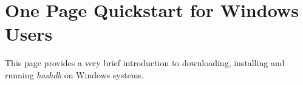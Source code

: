 \documentclass[11pt,fleqn]{article} %
\begin{document}
\newcommand \hdb {\textit{hashdb}\xspace}
\newcommand \sscope {\textit{SectorScope}\xspace}
\newcommand \bulk {\textbf{bulk\_extractor}\xspace}
\newcommand \mdd {\textbf{md5deep}\xspace}
\newcommand \fiwalk {\textbf{fiwalk}\xspace}





\setlength{\parindent}{0pt} %
\newpage
\thispagestyle{empty}
\mbox{}
\newpage

\section*{One Page Quickstart for Windows Users}
 This page provides a very brief introduction to downloading, installing and running \hdb on Windows systems. 
\end{document}
